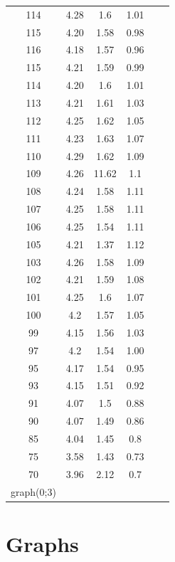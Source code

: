\documentclass[a4paper]{article}
\begin{document}
\begin{table}[htb]
\begin{tabular}{@{}cccccc@{}}
        114 & 4.28 & 1.6 & 1.01 &  &  \\
        115 & 4.20 & 1.58 & 0.98 &  &  \\
        116 & 4.18 & 1.57 & 0.96 &  &  \\
        115 & 4.21 & 1.59 & 0.99 &  &  \\
        114 & 4.20 & 1.6 & 1.01 &  &  \\
        113 & 4.21 & 1.61 & 1.03 &  &  \\
        112 & 4.25 & 1.62 & 1.05 &  &  \\
        111 & 4.23 & 1.63 & 1.07 &  &  \\
        110 & 4.29 & 1.62 & 1.09 &  &  \\
        109 & 4.26 & 11.62 & 1.1 &  &  \\
        108 & 4.24 & 1.58 & 1.11 &  &  \\
        107 & 4.25 & 1.58 & 1.11 &  &  \\
        106 & 4.25 & 1.54 & 1.11 &  &  \\
        105 & 4.21 & 1.37 & 1.12 &  &  \\
        103 & 4.26 & 1.58 & 1.09 &  &  \\
        102 & 4.21 & 1.59 & 1.08 &  &  \\
        101 & 4.25 & 1.6 & 1.07 &  &  \\
        100 & 4.2 & 1.57 & 1.05 &  &  \\
        99 & 4.15 & 1.56 & 1.03 &  &  \\
        97 & 4.2 & 1.54 & 1.00 &  &  \\
        95 & 4.17 & 1.54 & 0.95 &  &  \\
        93 & 4.15 & 1.51 & 0.92 &  &  \\
        91 & 4.07 & 1.5 & 0.88 &  &  \\
        90 & 4.07 & 1.49 & 0.86 &  &  \\
        85 & 4.04 & 1.45 & 0.8 &  &  \\
        75 & 3.58 & 1.43 & 0.73 &  &  \\
        70 & 3.96 & 2.12 & 0.7 &  &  \\
        graph(0;3) &  &  &  &  &  \\
        \bottomrule
    \end{tabular}
\end{table}

\hypertarget{graphs}{%
\section{Graphs}\label{graphs}}
\end{document}
